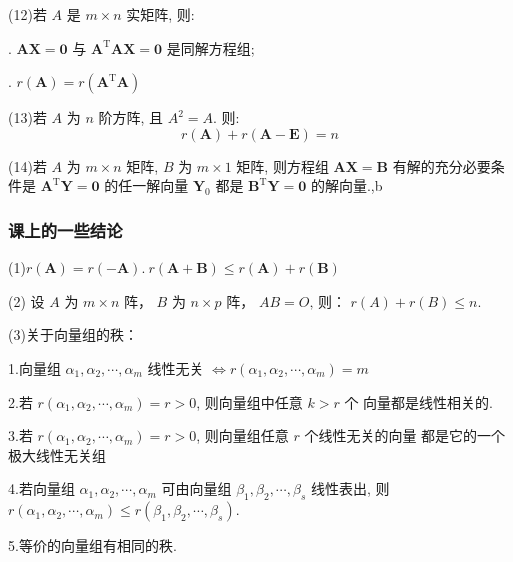 \documentclass{article}
\begin{document}
(12)若 $A$ 是 $m \times n$ 实矩阵, 则:

. $\boldsymbol{A X}=\mathbf{0}$ 与 $\boldsymbol{A}^{\mathrm{T}} \boldsymbol{A} \boldsymbol{X}=\mathbf{0}$ 是同解方程组;

. $r(\boldsymbol{A})=r\left(\boldsymbol{A}^{\mathrm{T}} \boldsymbol{A}\right)$

(13)若 $A$ 为 $n$ 阶方阵, 且 $A^{2}=A$. 则:
$$
r(\boldsymbol{A})+r(\boldsymbol{A}-\boldsymbol{E})=n
$$

(14)若 $A$ 为 $m \times n$ 矩阵, $B$ 为 $m \times 1$ 矩阵, 则方程组 $\boldsymbol{A X}=\boldsymbol{B}$ 有解的充分必要条件是 $\boldsymbol{A}^{\mathrm{T}} \boldsymbol{Y}=\mathbf{0}$ 的任一解向量 $\boldsymbol{Y}_{0}$ 都是 $\boldsymbol{B}^{\mathrm{T}} \boldsymbol{Y}=\mathbf{0}$ 的解向量.,b

\subsubsection{课上的一些结论}

(1)$r(\boldsymbol{A})=r(\boldsymbol{-A}).~r(\boldsymbol{A+B}) \leq r(\boldsymbol{A})+r(\boldsymbol{B})$

(2)$\text { 设 } A \text { 为 } m \times n \text { 阵， } B \text { 为 } n \times p \text { 阵， } A B=O \text {, 则： } r(A)+r(B) \leq n .$

(3)关于向量组的秩：

\qquad1.向量组 $\alpha_{1}, \alpha_{2}, \cdots, \alpha_{m}$ 线性无关 $\Leftrightarrow r\left(\alpha_{1}, \alpha_{2}, \cdots, \alpha_{m}\right)=m$

\qquad2.若 $r\left(\alpha_{1}, \alpha_{2}, \cdots, \alpha_{m}\right)=r>0$, 则向量组中任意 $k>r$ 个 向量都是线性相关的.

\qquad3.若 $r\left(\alpha_{1}, \alpha_{2}, \cdots, \alpha_{m}\right)=r>0$, 则向量组任意 $r$ 个线性无关的向量 都是它的一个极大线性无关组

\qquad4.若向量组 $\alpha_{1}, \alpha_{2}, \cdots, \alpha_{m}$ 可由向量组 $\beta_{1}, \beta_{2}, \cdots, \beta_{s}$ 线性表出, 则 $r\left(\alpha_{1}, \alpha_{2}, \cdots, \alpha_{m}\right) \leq r\left(\beta_{1}, \beta_{2}, \cdots, \beta_{s}\right)$.

\qquad5.等价的向量组有相同的秩.
\end{document}
